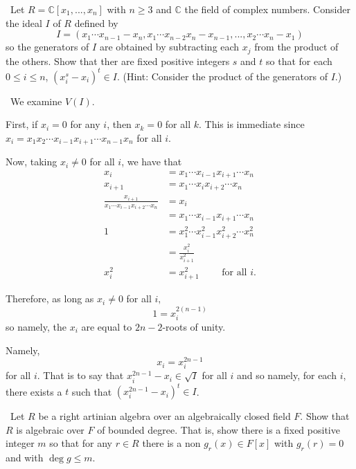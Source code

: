 \documentclass[12pt]{Qual}
\begin{document}
\begin{problem} $\,$
Let $R=\mathbb{C}[x_1,...,x_n]$ with $n\ge3$ and $\mathbb{C}$ the field of complex numbers. Consider the ideal $I$ of $R$ defined by $$I=(x_1\cdots x_{n-1}-x_n,x_1\cdots x_{n-2}x_n-x_{n-1},...,x_2\cdots x_n-x_1)$$ so the generators of $I$ are obtained by subtracting each $x_j$ from the product of the others. Show that ther are fixed positive integers $s$ and $t$ so that for each $0\le i\le n$, $(x_i^s-x_i)^t\in I$. (Hint: Consider the product of the generators of $I$.)
\end{problem}


\begin{solution}$\,$
We examine $V(I).$

First, if $x_i=0$ for any $i$, then $x_k=0$ for all $k$. This is immediate since $x_i=x_1x_2\cdots x_{i-1}x_{i+1}\cdots x_{n-1}x_n$ for all $i.$

Now, taking $x_i\not=0$ for all $i$, we have that \begin{align*}
    x_i&=x_1\cdots x_{i-1}x_{i+1}\cdots x_n\\
    x_{i+1}&=x_1\cdots x_ix_{i+2}\cdots x_n\\
    \frac{x_{i+1}}{x_1\cdots x_{i-1}x_{i+2}\cdots x_n}&=x_i\\
    &=x_1\cdots x_{i-1}x_{i+1}\cdots x_n\\
    1&=x_1^2\cdots x_{i-1}^2x_{i+2}^2\cdots x_n^2\\
    &=\frac{x_i^2}{x_{i+1}^2}\\
    x_i^2&=x_{i+1}^2\qquad\text{ for all }i.
\end{align*}

Therefore, as long as $x_i\not=0$ for all $i,$ $$1=x_i^{2(n-1)}$$ so namely, the $x_i$ are equal to $2n-2$-roots of unity.

Namely, $$x_i=x_i^{2n-1}$$ for all $i$. That is to say that $x_i^{2n-1}-x_i\in\sqrt{I}$ for all $i$ and so namely, for each $i$, there exists a $t$ such that $(x_i^{2n-1}-x_i)^t\in I$.
\end{solution}
\newpage

\begin{problem} $\,$
Let $R$ be a right artinian algebra over an algebraically closed field $F$. Show that $R$ is algebraic over $F$ of bounded degree. That is, show there is a fixed positive integer $m$ so that for any $r\in R$ there is a non $g_r(x)\in F[x]$ with $g_r(r)=0$ and with $\deg g\le m$.
\end{problem}
\end{document}
